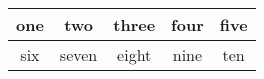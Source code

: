\documentclass{ctexart}
\begin{document}




\begin{tabular}{*{5}{|c}|}%
    \hline
    one & two   & three & four & five   \\
    \midrule
    six & seven & eight & nine &ten     \\
    
\end{tabular}
\end{document}
